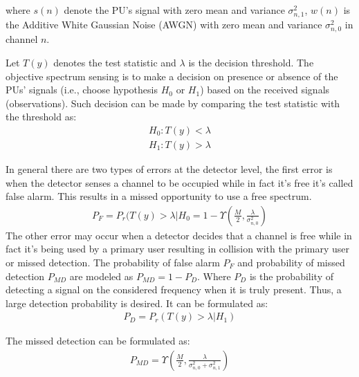 \documentclass[twocolumn]{el-author}
\begin{document}
where $s(n)$  denote the PU's signal with zero mean and variance $\sigma^2_{n,1}$, $ w(n) $ is the Additive White Gaussian Noise (AWGN) with zero mean and variance $\sigma^2_{n,0}$ in channel $ n $.
	

Let $ T(y) $ denotes the test statistic and $ \lambda $ is the decision threshold. The objective spectrum sensing is to make a decision on presence or absence of the PUs' signals (i.e., choose hypothesis $ H_0 $ or $ H_1 $) based on the received signals (observations). Such decision can be made by comparing the test statistic with the threshold as:
\begin{align}\label{kondolies2}
	H_0 : T(y)< \lambda
\end{align}
\begin{align}\label{kondolies3}
	H_1 : T(y)> \lambda 
\end{align}	

In general there are two types of errors at the detector level, the first error is when the detector senses a channel to be occupied while in fact it's free it's called false alarm. This results in a missed opportunity to use a free spectrum.
\begin{align}\label{kondolies4}
P_F= P_r (T(y)> \lambda|H_0 = 1-\Upsilon (\frac{M}{2},\frac{\lambda }{\sigma ^2_{n,0}})
\end{align}
The other error may occur when a detector decides that a channel is free while in fact it's being used by a primary user resulting in collision with the primary user or missed detection. The probability of false alarm ${P}_{F} $ and probability of missed detection ${P}_{MD}$ are modeled as\cite{1447503} $P_{MD}=1-P_D$. Where $ P_D $ is the probability of detecting a signal on the considered frequency when it is truly present. Thus, a large detection probability is desired. It can be formulated as: 
\begin{align}\label{kondolies5}
P_{D}= P_r (T(y)> \lambda|H_1)
\end{align} 

The missed detection can be formulated as: 
\begin{align}\label{kondolies6}
P_{MD} = \Upsilon (\frac{M}{2},\frac{\lambda }{\sigma ^2_{n,0}+\sigma ^2_{n,1}})
\end{align}	
	
\end{document}
